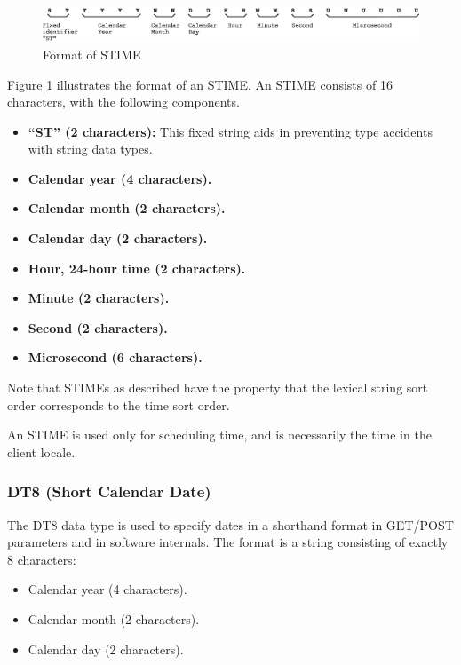 \documentclass[letterpaper,10pt,titlepage]{article}
\begin{document}
\begin{figure}
\centering
\includegraphics[width=4.6in]{stimeformat01.eps}
\caption{Format of STIME}
\label{fig:stdd0:sdty0:stim0:00}
\end{figure}

Figure \ref{fig:stdd0:sdty0:stim0:00} illustrates the format of
an STIME\@.  An STIME consists of 16 characters, with the following
components.

\begin{itemize}
\item \textbf{``ST'' (2 characters):}
      This fixed string aids in preventing type accidents with
      string data types.
\item \textbf{Calendar year (4 characters).}
\item \textbf{Calendar month (2 characters).}
\item \textbf{Calendar day (2 characters).}
\item \textbf{Hour, 24-hour time (2 characters).}
\item \textbf{Minute (2 characters).}
\item \textbf{Second (2 characters).}
\item \textbf{Microsecond (6 characters).}
\end{itemize}

Note that STIMEs as described have the property that the lexical
string sort order corresponds to the time sort order.

An STIME is used only for scheduling time, and is necessarily the time in the
client locale.



\subsubsection{DT8 (Short Calendar Date)}
\label{stdd0:sdty0:sdat8}

%
The DT8 data type is used to specify dates in a shorthand
format in GET/POST parameters and in software internals.
The format is a string consisting of exactly 8
characters:

\begin{itemize}
\item Calendar year (4 characters).
\item Calendar month (2 characters).
\item Calendar day (2 characters).
\end{itemize}
\end{document}
